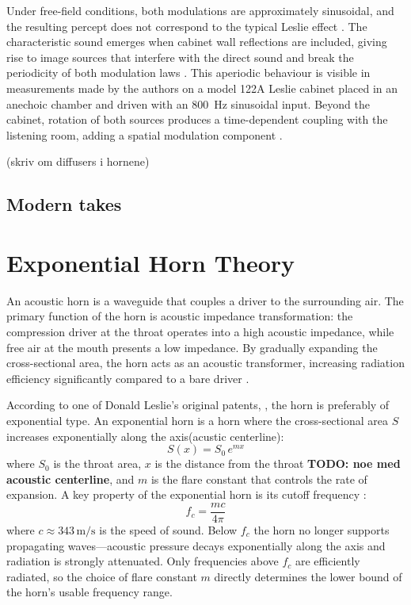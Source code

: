 Under free-field conditions, both modulations are approximately sinusoidal, and the resulting percept does not correspond to the typical Leslie effect \cite{kronland2008}. The characteristic sound emerges when cabinet wall reflections are included, giving rise to image sources that interfere with the direct sound and break the periodicity of both modulation laws \cite{kronland2008}. This aperiodic behaviour is visible in measurements made by the authors on a model 122A Leslie cabinet placed in an anechoic chamber and driven with an 800~Hz sinusoidal input. Beyond the cabinet, rotation of both sources produces a time-dependent coupling with the listening room, adding a spatial modulation component \cite{kronland2008}.

(skriv om diffusers i hornene)

\subsection{Modern takes}

\section{Exponential Horn Theory}

An acoustic horn is a waveguide that couples a driver to the surrounding air. The primary function of the horn is acoustic impedance transformation: the compression driver at the throat operates into a high acoustic impedance, while free air at the mouth presents a low impedance. By gradually expanding the cross-sectional area, the horn acts as an acoustic transformer, increasing radiation efficiency significantly compared to a bare driver \citep{Kolbrek2008HornTheoryPart1}.

According to one of Donald Leslie's original patents, \cite{Leslie1949RotatableTremulantSoundProducer}, the horn is preferably of exponential type.
An exponential horn is a horn where the cross-sectional area $S$ increases exponentially along the axis(acustic centerline):
\begin{equation}
	S(x) = S_0\,e^{mx}
	\label{eq:horn-area}
\end{equation}
where $S_0$ is the throat area, $x$ is the distance from the throat \textbf{TODO: noe med acoustic centerline}, and $m$ is the flare constant that controls the rate of expansion. A key property of the exponential horn is its cutoff frequency \citep{Kolbrek2008HornTheoryPart1}:
\begin{equation}
	f_c = \frac{mc}{4\pi}
	\label{eq:horn-cutoff}
\end{equation}
where $c \approx 343\,\text{m/s}$ is the speed of sound. Below $f_c$ the horn no longer supports propagating waves---acoustic pressure decays exponentially along the axis and radiation is strongly attenuated. Only frequencies above $f_c$ are efficiently radiated, so the choice of flare constant $m$ directly determines the lower bound of the horn's usable frequency range.


